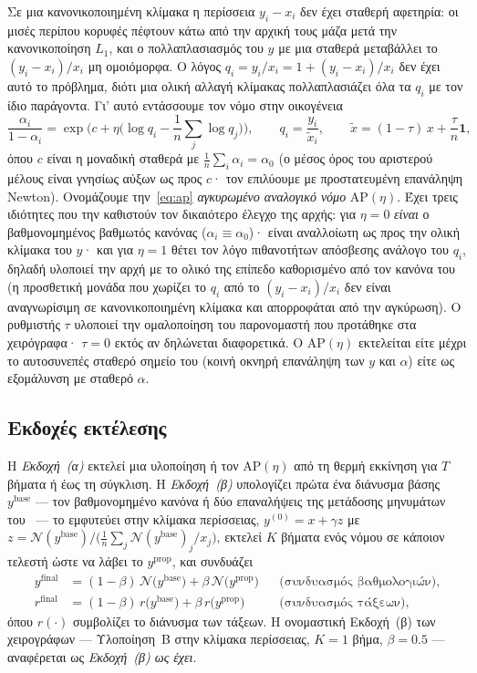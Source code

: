 \documentclass[11pt,a4paper]{article}
\theoremstyle{definition}
\theoremstyle{plain}
\newcommand{\N}{\mathcal{N}}
\newcommand{\AP}{\mathrm{AP}}
\newcommand{\one}{\mathbf{1}}
\begin{document}
Σε μια κανονικοποιημένη κλίμακα η περίσσεια $y_i-x_i$ δεν έχει σταθερή αφετηρία: οι μισές περίπου κορυφές πέφτουν κάτω από την αρχική τους μάζα μετά την κανονικοποίηση $L_1$, και ο πολλαπλασιασμός του $y$ με μια σταθερά μεταβάλλει το $(y_i-x_i)/x_i$ μη ομοιόμορφα. Ο λόγος $q_i=y_i/x_i=1+(y_i-x_i)/x_i$ δεν έχει αυτό το πρόβλημα, διότι μια ολική αλλαγή κλίμακας πολλαπλασιάζει όλα τα $q_i$ με τον ίδιο παράγοντα. Γι' αυτό εντάσσουμε τον νόμο στην οικογένεια
\begin{equation}\label{eq:ap}
\frac{\alpha_i}{1-\alpha_i}=\exp\Big(c+\eta\Big(\log q_i-\frac1n\sum_{j}\log q_j\Big)\Big),\qquad q_i=\frac{y_i}{\tilde x_i},\qquad \tilde x=(1-\tau)\,x+\frac{\tau}{n}\one,
\end{equation}
όπου $c$ είναι η μοναδική σταθερά με $\frac1n\sum_i\alpha_i=\alpha_0$ (ο μέσος όρος του αριστερού μέλους είναι γνησίως αύξων ως προς $c$· τον επιλύουμε με προστατευμένη επανάληψη Newton). Ονομάζουμε την~\eqref{eq:ap} \emph{αγκυρωμένο αναλογικό νόμο} $\AP(\eta)$. Έχει τρεις ιδιότητες που την καθιστούν τον δικαιότερο έλεγχο της αρχής: για $\eta=0$ \emph{είναι} ο βαθμονομημένος βαθμωτός κανόνας ($\alpha_i\equiv\alpha_0$)· είναι αναλλοίωτη ως προς την ολική κλίμακα του $y$· και για $\eta=1$ θέτει τον λόγο πιθανοτήτων απόσβεσης ανάλογο του $q_i$, δηλαδή υλοποιεί την αρχή με το ολικό της επίπεδο καθορισμένο από τον κανόνα του~\cite{konstantellos26} (η προσθετική μονάδα που χωρίζει το $q_i$ από το $(y_i-x_i)/x_i$ δεν είναι αναγνωρίσιμη σε κανονικοποιημένη κλίμακα και απορροφάται από την αγκύρωση). Ο ρυθμιστής $\tau$ υλοποιεί την ομαλοποίηση του παρονομαστή που προτάθηκε στα χειρόγραφα· $\tau=0$ εκτός αν δηλώνεται διαφορετικά. Ο $\AP(\eta)$ εκτελείται είτε μέχρι το αυτοσυνεπές σταθερό σημείο του (κοινή οκνηρή επανάληψη των $y$ και $\alpha$) είτε ως εξομάλυνση με σταθερό $\alpha$.

\subsection{Εκδοχές εκτέλεσης}\label{sec:modes}

Η \emph{Εκδοχή~(α)} εκτελεί μια υλοποίηση ή τον $\AP(\eta)$ από τη θερμή εκκίνηση για $T$ βήματα ή έως τη σύγκλιση. Η \emph{Εκδοχή~(β)} υπολογίζει πρώτα ένα διάνυσμα βάσης $y^{\mathrm{base}}$ --- τον βαθμονομημένο κανόνα ή δύο επαναλήψεις της μετάδοσης μηνυμάτων του~\cite{knz14} --- το εμφυτεύει στην κλίμακα περίσσειας, $y^{(0)}=x+\gamma z$ με $z=\N(y^{\mathrm{base}})/\big(\tfrac1n\sum_j\N(y^{\mathrm{base}})_j/x_j\big)$, εκτελεί $K$ βήματα ενός νόμου σε κάποιον τελεστή ώστε να λάβει το $y^{\mathrm{prop}}$, και συνδυάζει
\begin{align}
y^{\mathrm{final}}&=(1-\beta)\,\N\big(y^{\mathrm{base}}\big)+\beta\,\N\big(y^{\mathrm{prop}}\big) &&\text{(συνδυασμός βαθμολογιών)},\label{eq:blend}\\
r^{\mathrm{final}}&=(1-\beta)\,r\big(y^{\mathrm{base}}\big)+\beta\,r\big(y^{\mathrm{prop}}\big) &&\text{(συνδυασμός τάξεων)},\nonumber
\end{align}
όπου $r(\cdot)$ συμβολίζει το διάνυσμα των τάξεων. Η ονομαστική Εκδοχή~(β) των χειρογράφων --- Υλοποίηση~Β στην κλίμακα περίσσειας, $K=1$ βήμα, $\beta=0.5$ --- αναφέρεται ως \emph{Εκδοχή~(β) ως έχει}.
\end{document}
